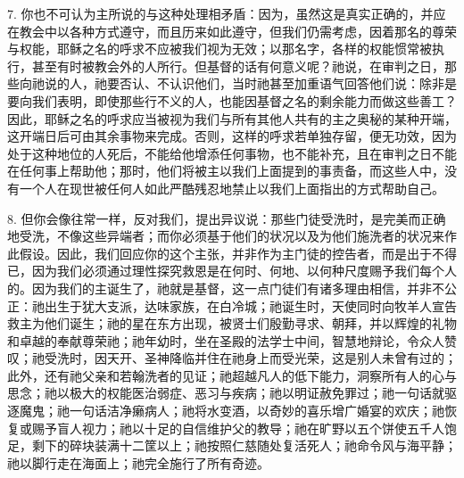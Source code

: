 7. 你也不可认为主所说的与这种处理相矛盾：因为，虽然这是真实正确的，并应在教会中以各种方式遵守，而且历来如此遵守，但我们仍需考虑，因着那名的尊荣与权能，耶稣之名的呼求不应被我们视为无效；以那名字，各样的权能惯常被执行，甚至有时被教会外的人所行。但基督的话有何意义呢？祂说，在审判之日，那些向祂说的人，祂要否认、不认识他们，当时祂甚至加重语气回答他们说：除非是要向我们表明，即使那些行不义的人，也能因基督之名的剩余能力而做这些善工？因此，耶稣之名的呼求应当被视为我们与所有其他人共有的主之奥秘的某种开端，这开端日后可由其余事物来完成。否则，这样的呼求若单独存留，便无功效，因为处于这种地位的人死后，不能给他增添任何事物，也不能补充，且在审判之日不能在任何事上帮助他；那时，他们将被主以我们上面提到的事责备，而这些人中，没有一个人在现世被任何人如此严酷残忍地禁止以我们上面指出的方式帮助自己。\par

8. 但你会像往常一样，反对我们，提出异议说：那些门徒受洗时，是完美而正确地受洗，不像这些异端者；而你必须基于他们的状况以及为他们施洗者的状况来作此假设。因此，我们回应你的这个主张，并非作为主门徒的控告者，而是出于不得已，因为我们必须通过理性探究救恩是在何时、何地、以何种尺度赐予我们每个人的。因为我们的主诞生了，祂就是基督，这一点门徒们有诸多理由相信，并非不公正：祂出生于犹大支派，达味家族，在白冷城；祂诞生时，天使同时向牧羊人宣告救主为他们诞生；祂的星在东方出现，被贤士们殷勤寻求、朝拜，并以辉煌的礼物和卓越的奉献尊荣祂；祂年幼时，坐在圣殿的法学士中间，智慧地辩论，令众人赞叹；祂受洗时，因天开、圣神降临并住在祂身上而受光荣，这是别人未曾有过的；此外，还有祂父亲和若翰洗者的见证；祂超越凡人的低下能力，洞察所有人的心与思念；祂以极大的权能医治弱症、恶习与疾病；祂以明证赦免罪过；祂一句话就驱逐魔鬼；祂一句话洁净癞病人；祂将水变酒，以奇妙的喜乐增广婚宴的欢庆；祂恢复或赐予盲人视力；祂以十足的自信维护父的教导；祂在旷野以五个饼使五千人饱足，剩下的碎块装满十二筐以上；祂按照仁慈随处复活死人；祂命令风与海平静；祂以脚行走在海面上；祂完全施行了所有奇迹。\par

